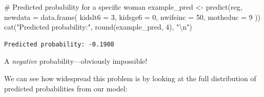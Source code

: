 \documentclass[
  letterpaper,
  DIV=11,
  numbers=noendperiod]{scrreprt}
\newenvironment{Shaded}{\begin{snugshade}}{\end{snugshade}}
\newcommand{\AttributeTok}[1]{\textcolor[rgb]{0.40,0.45,0.13}{#1}}
\newcommand{\CommentTok}[1]{\textcolor[rgb]{0.37,0.37,0.37}{#1}}
\newcommand{\DecValTok}[1]{\textcolor[rgb]{0.68,0.00,0.00}{#1}}
\newcommand{\FunctionTok}[1]{\textcolor[rgb]{0.28,0.35,0.67}{#1}}
\newcommand{\NormalTok}[1]{\textcolor[rgb]{0.00,0.23,0.31}{#1}}
\newcommand{\OtherTok}[1]{\textcolor[rgb]{0.00,0.23,0.31}{#1}}
\newcommand{\SpecialCharTok}[1]{\textcolor[rgb]{0.37,0.37,0.37}{#1}}
\newcommand{\StringTok}[1]{\textcolor[rgb]{0.13,0.47,0.30}{#1}}
\begin{document}
\begin{Shaded}
\begin{Highlighting}[]
\CommentTok{\# Predicted probability for a specific woman}
\NormalTok{example\_pred }\OtherTok{\textless{}{-}} \FunctionTok{predict}\NormalTok{(reg, }\AttributeTok{newdata =} \FunctionTok{data.frame}\NormalTok{(}
    \AttributeTok{kidslt6 =} \DecValTok{3}\NormalTok{, }\AttributeTok{kidsge6 =} \DecValTok{0}\NormalTok{, }\AttributeTok{nwifeinc =} \DecValTok{50}\NormalTok{, }\AttributeTok{motheduc =} \DecValTok{9}
\NormalTok{))}
\FunctionTok{cat}\NormalTok{(}\StringTok{"Predicted probability:"}\NormalTok{, }\FunctionTok{round}\NormalTok{(example\_pred, }\DecValTok{4}\NormalTok{), }\StringTok{"}\SpecialCharTok{\textbackslash{}n}\StringTok{"}\NormalTok{)}
\end{Highlighting}
\end{Shaded}

\begin{verbatim}
Predicted probability: -0.1908 
\end{verbatim}

A \emph{negative} probability---obviously impossible!

We can see how widespread this problem is by looking at the full
distribution of predicted probabilities from our model:
\end{document}
